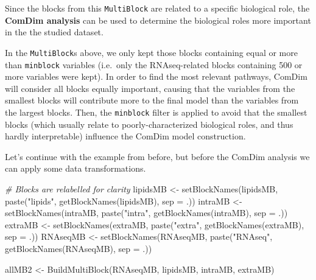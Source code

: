 \documentclass[
]{book}
\newenvironment{Shaded}{\begin{snugshade}}{\end{snugshade}}
\newcommand{\AttributeTok}[1]{\textcolor[rgb]{0.77,0.63,0.00}{#1}}
\newcommand{\CommentTok}[1]{\textcolor[rgb]{0.56,0.35,0.01}{\textit{#1}}}
\newcommand{\FunctionTok}[1]{\textcolor[rgb]{0.00,0.00,0.00}{#1}}
\newcommand{\NormalTok}[1]{#1}
\newcommand{\OtherTok}[1]{\textcolor[rgb]{0.56,0.35,0.01}{#1}}
\newcommand{\StringTok}[1]{\textcolor[rgb]{0.31,0.60,0.02}{#1}}
\begin{document}
Since the blocks from this \texttt{MultiBlock} are related to a specific biological
role, the \textbf{ComDim analysis} can be used to determine the biological roles more
important in the the studied dataset.

In the \texttt{MultiBlock}s above, we only kept those blocks containing equal or more
than \texttt{minblock} variables (i.e.~only the RNAseq-related blocks containing 500 or
more variables were kept).
In order to find the most relevant pathways, ComDim will consider all blocks
equally important, causing that the variables from the smallest blocks will
contribute more to the final model than the variables from the largest blocks.
Then, the \texttt{minblock} filter is applied to avoid that the smallest blocks
(which usually relate to poorly-characterized biological roles, and thus hardly
interpretable) influence the ComDim model construction.

Let's continue with the example from before, but before the ComDim analysis we
can apply some data transformations.

\begin{Shaded}
\begin{Highlighting}[]
\CommentTok{\# Blocks are relabelled for clarity}
\NormalTok{lipidsMB }\OtherTok{\textless{}{-}} \FunctionTok{setBlockNames}\NormalTok{(lipidsMB,}
                          \FunctionTok{paste}\NormalTok{(}\StringTok{"lipids"}\NormalTok{, }\FunctionTok{getBlockNames}\NormalTok{(lipidsMB), }\AttributeTok{sep =} \StringTok{\textquotesingle{}.\textquotesingle{}}\NormalTok{))}
\NormalTok{intraMB }\OtherTok{\textless{}{-}} \FunctionTok{setBlockNames}\NormalTok{(intraMB,}
                         \FunctionTok{paste}\NormalTok{(}\StringTok{"intra"}\NormalTok{, }\FunctionTok{getBlockNames}\NormalTok{(intraMB), }\AttributeTok{sep =} \StringTok{\textquotesingle{}.\textquotesingle{}}\NormalTok{))}
\NormalTok{extraMB }\OtherTok{\textless{}{-}} \FunctionTok{setBlockNames}\NormalTok{(extraMB,}
                         \FunctionTok{paste}\NormalTok{(}\StringTok{"extra"}\NormalTok{, }\FunctionTok{getBlockNames}\NormalTok{(extraMB), }\AttributeTok{sep =} \StringTok{\textquotesingle{}.\textquotesingle{}}\NormalTok{))}
\NormalTok{RNAseqMB }\OtherTok{\textless{}{-}} \FunctionTok{setBlockNames}\NormalTok{(RNAseqMB,}
                          \FunctionTok{paste}\NormalTok{(}\StringTok{"RNAseq"}\NormalTok{, }\FunctionTok{getBlockNames}\NormalTok{(RNAseqMB), }\AttributeTok{sep =} \StringTok{\textquotesingle{}.\textquotesingle{}}\NormalTok{))}

\NormalTok{allMB2 }\OtherTok{\textless{}{-}} \FunctionTok{BuildMultiBlock}\NormalTok{(RNAseqMB, lipidsMB, intraMB, extraMB)}
\end{Highlighting}
\end{Shaded}
\end{document}
